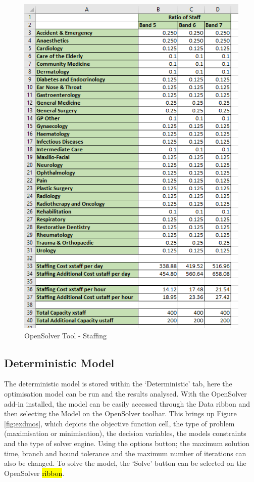 \documentclass[../thesis.tex]{subfiles}
\begin{document}
\begin{figure}[h!]
    \centering
    \includegraphics{Chapters/Chapter7/Figures/Staff.png}
    \caption{OpenSolver Tool - Staffing}
    \label{fig:exstaff}
\end{figure}

\subsection{Deterministic Model}
The deterministic model is stored within the `Deterministic' tab, here the optimisation model can be run and the results analysed. With the OpenSolver add-in installed, the model can be easily accessed through the Data ribbon and then selecting the Model on the OpenSolver toolbar. This brings up Figure \ref{fig:exdmos}, which depicts the objective function cell, the type of problem (maximisation or minimisation), the decision variables, the models constraints and the type of solver engine. Using the options button; the maximum solution time, branch and bound tolerance and the maximum number of iterations can also be changed. To solve the model, the `Solve' button can be selected on the OpenSolver \hl{ribbon}.
\end{document}
